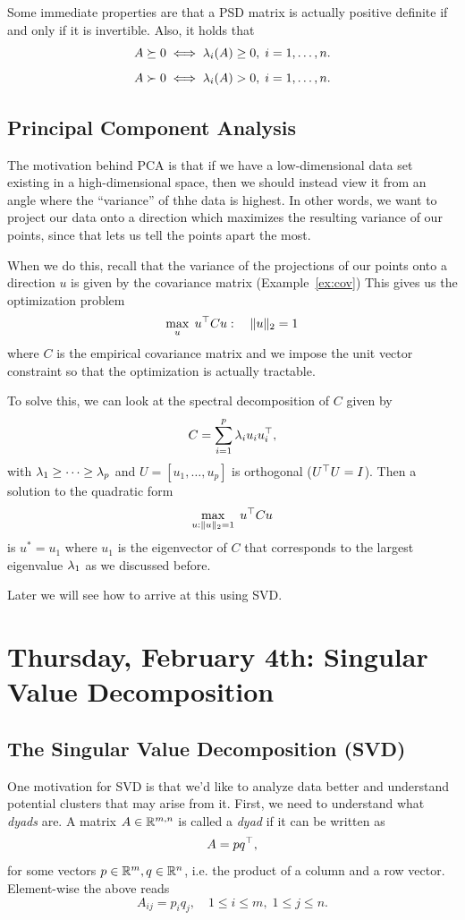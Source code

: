 \documentclass[11 pt]{scrartcl}
\begin{document}
Some immediate properties are that a PSD matrix is actually positive definite if and only if it is invertible. 
Also, it holds that 
\[ A \succeq 0 \iff \lambda_i(A) \geq 0,\; i=1, \dots, n.\] 
\[ A \succ   0 \iff \lambda_i(A) > 0,\; i=1, \dots, n.\] 


\subsection{Principal Component Analysis}

The motivation behind PCA is that if we have a low-dimensional data set existing in a high-dimensional space, then we should instead view it from an angle where the ``variance'' of thhe data is highest. 
In other words, we want to project our data onto a direction which maximizes the resulting variance of our points, since that lets us tell the points apart the most. 

When we do this, recall that the variance of the projections of our points onto a direction $u$ is given by the covariance matrix (Example~\ref{ex:cov})
This gives us the optimization problem 
\[ \max_u\; u^\top C u: \quad \|u\|_2 = 1\] 
where $C$ is the empirical covariance matrix and we impose the unit vector constraint so that the optimization is actually tractable. 

To solve this, we can look at the spectral decomposition of $C$ given by 
\[ C = \sum_{i=1}^p \lambda_i u_i u_i^\top,\] 
with $\lambda_1 \geq \dots \geq \lambda_p$ and $U = [u_1,\dots, u_p]$ is orthogonal ($U^\top U = I$). Then a solution to the quadratic form 
\[ \max_{u: \|u\|_2=1} \; u^\top C u\] 
is $u^* = u_1$ where $u_1$ is the eigenvector of $C$ that corresponds to the largest eigenvalue $\lambda_1$ as we discussed before. 

Later we will see how to arrive at this using SVD. 


\newpage
\section{Thursday, February 4th: Singular Value Decomposition}
\subsection{The Singular Value Decomposition (SVD)}
One motivation for SVD is that we'd like to analyze data better and understand potential clusters that may arise from it. 
First, we need to understand what \emph{dyads} are. 
A matrix $A\in \mathbb R^{m,n}$ is called a \emph{dyad} if it can be written as 
\[ A = pq^\top,\] 
for some vectors $p\in \mathbb R^m, q\in \mathbb R^n$, i.e. the product of a column and a row vector.
Element-wise the above reads 
\[ A_{ij} = p_iq_j, \quad 1\leq i\leq m,\; 1\leq j \leq n.\] 
\end{document}
